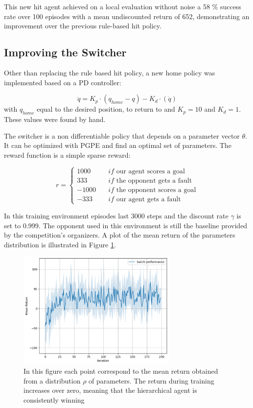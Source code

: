 This new hit agent achieved on a local evaluation without noise a 58 \% success rate over 100 episodes with a mean undiscounted return of 652, 
demonstrating an improvement over the previous rule-based hit policy.

\subsection{Improving the Switcher}
Other than replacing the rule based hit policy, a new home policy was implemented based on a PD controller:

\begin{equation*}
    \ddot{q} = K_p \cdot \left(q_{home} - q\right) - K_d \cdot \left(\dot{q}\right)
\end{equation*}
with $q_{home}$ equal to the desired position,  to return to and $K_p = 10$ and $K_d = 1$. These values were found by hand.

The switcher is a non differentiable policy that depends on a parameter vector $\theta$. It can be optimized with PGPE \cite{PGPE} and find an optimal set of parameters.
The reward function is a simple sparse reward:

\begin{equation*}
    r = \left\{
        \begin{aligned}
            1000 \quad &if \text{ our agent scores a goal} \\
            333 \quad &if \text{ the opponent gets a fault} \\
            -1000 \quad &if \text{ the opponent scores a goal} \\
            -333 \quad &if \text{ our agent gets a fault}
        \end{aligned}
    \right.
\end{equation*}

In this training environment episodes last 3000 steps and the discount rate $\gamma$ is set to 0.999.
The opponent used in this environment is still the baseline provided by the competition's organizers.
A plot of the mean return of the parameters distribution is illustrated in Figure \ref{fig:pgpe_return}.

\begin{figure}
    \centering
    \includegraphics[width=0.7\textwidth]{Images/pgpe_return.pdf}
    \caption[PGPE mean return.]{In this figure each point correspond to the mean return obtained from a distribution $\rho$ of parameters. The return during training increases
    over zero, meaning that the hierarchical agent is consistently winning}
    \label{fig:pgpe_return}
\end{figure}